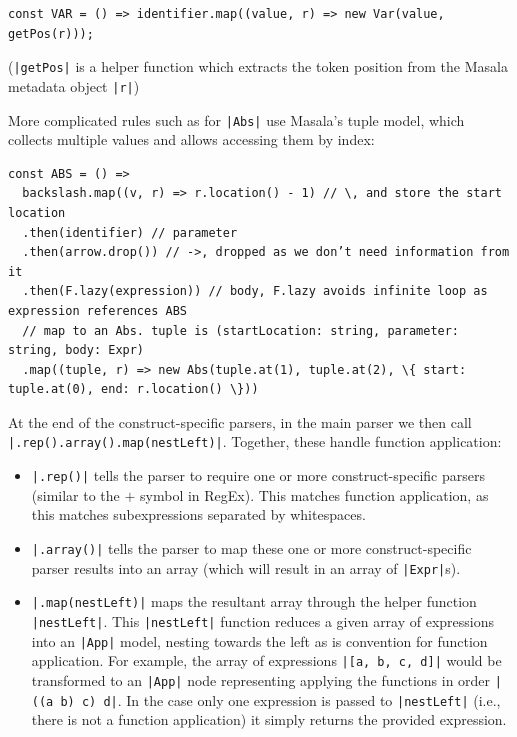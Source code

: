 \documentclass[a4paper,fleqn,12pt]{article}
\begin{document}
\begin{verbatim}
const VAR = () => identifier.map((value, r) => new Var(value, getPos(r)));
\end{verbatim}

(\texttt{|getPos|} is a helper function which extracts the token position from the Masala metadata object \texttt{|r|})

More complicated rules such as for \texttt{|Abs|} use Masala’s tuple model, which collects multiple values and allows accessing them by index:

\begin{verbatim}
const ABS = () =>
  backslash.map((v, r) => r.location() - 1) // \, and store the start location
  .then(identifier) // parameter
  .then(arrow.drop()) // ->, dropped as we don’t need information from it
  .then(F.lazy(expression)) // body, F.lazy avoids infinite loop as expression references ABS
  // map to an Abs. tuple is (startLocation: string, parameter: string, body: Expr)
  .map((tuple, r) => new Abs(tuple.at(1), tuple.at(2), \{ start: tuple.at(0), end: r.location() \}))
\end{verbatim}

At the end of the construct-specific parsers, in the main parser we then call \texttt{|.rep().array().map(nestLeft)|}. Together, these handle function application:
\begin{itemize}
  \item \texttt{|.rep()|} tells the parser to require one or more construct-specific parsers (similar to the $+$ symbol in RegEx). This matches function application, as this matches subexpressions separated by whitespaces.
  \item \texttt{|.array()|} tells the parser to map these one or more construct-specific parser results into an array (which will result in an array of \texttt{|Expr|}s).
  \item \texttt{|.map(nestLeft)|} maps the resultant array through the helper function \texttt{|nestLeft|}. This \texttt{|nestLeft|} function reduces a given array of expressions into an \texttt{|App|} model, nesting towards the left as is convention for function application. For example, the array of expressions \texttt{|[a, b, c, d]|} would be transformed to an \texttt{|App|} node representing applying the functions in order \texttt{|((a b) c) d|}. In the case only one expression is passed to \texttt{|nestLeft|} (i.e., there is not a function application) it simply returns the provided expression.
\end{itemize}
\end{document}
